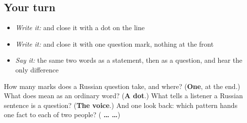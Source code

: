 \subsection*{Your turn}
\begin{itemize}
\raggedright
  \item \emph{Write it:} \emph{  } and close it with a dot on the line
  \item \emph{Write it:} \emph{  } and close it with one question mark, nothing at the front
  \item \emph{Say it:} the same two words as a statement, then as a question, and hear the only difference
\end{itemize}

\begin{tcolorbox}[breakable,colback=teal!4,colframe=teal!35!black,title={Before you move on}]
How many marks does a Russian question take, and where? (\textbf{One}, at the end.) What does \textbf{} mean as an ordinary word? (\textbf{A dot}.) What tells a listener a Russian sentence is a question? (\textbf{The voice}.) And one look back: which pattern hands one fact to each of two people? (\textbf{ …  …})
\end{tcolorbox}
